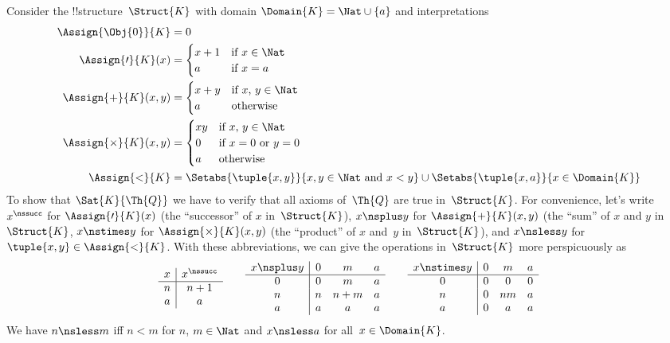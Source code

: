 \documentclass[../../../include/open-logic-section]{subfiles}
\begin{document}
\begin{ex}
Consider the !!{structure}~$\Struct{K}$ with domain $\Domain{K} = \Nat
\cup \{a\}$ and interpretations
\begin{align*}
  \Assign{\Obj{0}}{K} & = 0\\
  \Assign{\prime}{K}(x) & =
  \begin{cases}
    x+1 & \text{if $x\in \Nat$}\\
    a & \text{if $x = a$}
  \end{cases}\\
  \Assign{+}{K}(x, y) & =
  \begin{cases}
    x+y & \text{if $x$, $y \in\Nat$}\\
    a & \text{otherwise}
  \end{cases}\\
  \Assign{\times}{K}(x, y) & =
  \begin{cases}
    xy & \text{if $x$, $y \in\Nat$}\\
    0 & \text{if $x = 0$ or $y = 0$}\\
    a & \text{otherwise}\\
  \end{cases}\\
  \Assign{<}{K} & =
  \Setabs{\tuple{x,y}}{x, y \in \Nat \text{ and } x<y} \cup
  \Setabs{\tuple{x,a}}{x \in \Domain{K}}
\end{align*}
To show that $\Sat{K}{\Th{Q}}$ we have to verify that all axioms
of~$\Th{Q}$ are true in~$\Struct{K}$.  For convenience, let's write
$x^\nssucc$ for $\Assign{\prime}{K}(x)$ (the ``successor'' of $x$
in~$\Struct{K}$), $x \nsplus y$ for $\Assign{+}{K}(x, y)$ (the ``sum''
of $x$ and $y$ in~$\Struct{K}$, $x \nstimes y$ for
$\Assign{\times}{K}(x, y)$ (the ``product'' of $x$ and~$y$
in~$\Struct{K}$), and $x \nsless y$ for $\tuple{x,y} \in
\Assign{<}{K}$. With these abbreviations, we can give the operations
in~$\Struct{K}$ more perspicuously as
\[
\begin{array}{c|c}
  x & x^\nssucc \\
  \hline
  n & n+1 \\
  a & a
\end{array}
\qquad
\begin{array}{c|ccc}
  x \nsplus y & 0 & m & a \\
  \hline
  0 & 0 & m & a \\
  n & n & n+m & a \\
  a & a & a & a \\
\end{array}
\qquad
\begin{array}{c|ccc}
  x \nstimes y & 0 & m & a \\
  \hline
  0 & 0 & 0 & 0 \\
  n & 0 & nm & a \\
  a & 0 & a & a \\
\end{array}
\]
We have $n \nsless m$ iff $n<m$ for $n$, $m \in \Nat$ and $x \nsless
a$ for all~$x \in \Domain{K}$.


\end{ex}
\end{document}
